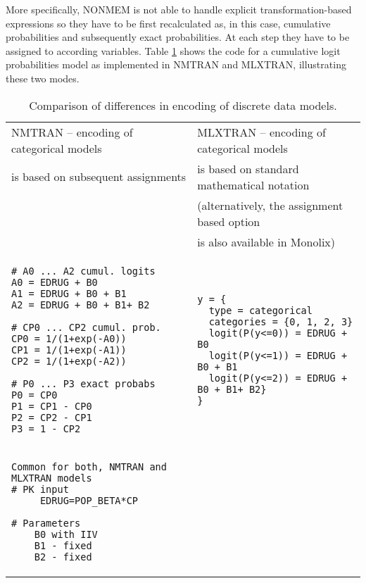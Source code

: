 More specifically, NONMEM is not able to handle explicit transformation-based expressions 
so they have to be first recalculated as, in this case, cumulative probabilities and subsequently 
exact probabilities. At each step they have to be assigned to according variables. 
Table \ref{tab:twoModes} shows the code for a cumulative logit probabilities 
model as implemented in NMTRAN and MLXTRAN, illustrating these two modes.

\begin{table}[ht!]
\setlength{\tabcolsep}{15pt}
\begin{center}
\begin{tabular}{ll}
  \hline \hline
NMTRAN -- encoding of categorical models  	& MLXTRAN -- encoding of categorical models \\[-.25ex]
is based on subsequent assignments   		& is based on standard mathematical notation \\[-.25ex]
									& (alternatively, the assignment based option \\[-.25ex]
									&  is also available in Monolix) \\
  \hline
\lstset{language=NONMEMdataSet}
\begin{lstlisting}
# A0 ... A2 cumul. logits
A0 = EDRUG + B0
A1 = EDRUG + B0 + B1
A2 = EDRUG + B0 + B1+ B2
 
# CP0 ... CP2 cumul. prob.
CP0 = 1/(1+exp(-A0))
CP1 = 1/(1+exp(-A1))
CP2 = 1/(1+exp(-A2))
 
# P0 ... P3 exact probabs
P0 = CP0
P1 = CP1 - CP0
P2 = CP2 - CP1
P3 = 1 - CP2
\end{lstlisting}
&
\lstset{language=MLXTRANcode}
\begin{lstlisting}
y = {
  type = categorical
  categories = {0, 1, 2, 3}
  logit(P(y<=0)) = EDRUG + B0
  logit(P(y<=1)) = EDRUG + B0 + B1
  logit(P(y<=2)) = EDRUG + B0 + B1+ B2}
}
\end{lstlisting} 

\\
\hline
\lstset{language=MLXTRANcode}
\begin{lstlisting}
Common for both, NMTRAN and MLXTRAN models
# PK input
     EDRUG=POP_BETA*CP

# Parameters
    B0 with IIV
    B1 - fixed
    B2 - fixed
\end{lstlisting}
\\
  \hline
\end{tabular}
\caption[Comparison of differences in encoding of discrete data models.]{%
      Comparison of differences in encoding of discrete data models\label{tab:}.}
\label{tab:twoModes}
\end{center}
\end{table}

